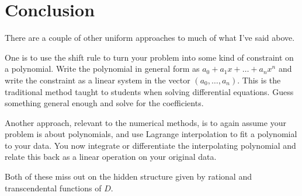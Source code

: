 \documentclass[a4paper]{article}
\theoremstyle{definition}
\begin{document}
\section{Conclusion}
There are a couple of other uniform approaches to much of what I've said above.

One is to use the shift rule to turn your problem into some kind of constraint on a polynomial.
Write the polynomial in general form as $a_0+a_1x+\ldots+a_nx^n$ and write the constraint as a linear system in the vector $(a_0,\ldots,a_n)$.
This is the traditional method taught to students when solving differential equations.
Guess something general enough and solve for the coefficients.

Another approach, relevant to the numerical methods, is to again assume your problem is about polynomials, and use Lagrange interpolation to fit a polynomial to your data.
You now integrate or differentiate the interpolating polynomial and relate this back as a linear operation on your original data.

Both of these miss out on the hidden structure given by rational and transcendental functions of $D$.



\end{document}
